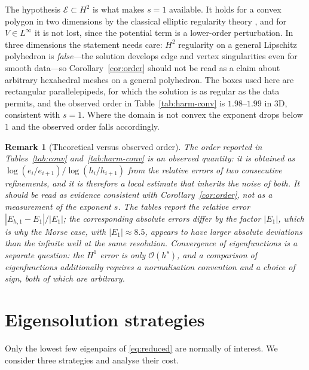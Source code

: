 \documentclass[pdflatex,sn-mathphys-num]{sn-jnl}
\theoremstyle{thmstyleone}%
\theoremstyle{thmstyletwo}%
\newtheorem{remark}{Remark}%
\theoremstyle{thmstylethree}%
\begin{document}
The hypothesis $\mathcal{E} \subset H^2$ is what makes $s = 1$ available. It
holds for a convex polygon in two dimensions by the classical elliptic
regularity theory \cite{boffi2010,babuska1991}, and for $V \in L^\infty$ it is not lost,
since the potential term is a lower-order perturbation. In three dimensions the
statement needs care: $H^2$ regularity on a general Lipschitz polyhedron is
\emph{false}---the solution develops edge and vertex singularities even for
smooth data---so Corollary~\ref{cor:order} should not be read as a claim about
arbitrary hexahedral meshes on a general polyhedron. The boxes used here are
rectangular parallelepipeds, for which the solution is as regular as the data
permits, and the observed order in Table~\ref{tab:harm-conv} is $1.98$--$1.99$
in 3D, consistent with $s = 1$. Where the domain is not convex the exponent
drops below $1$ and the observed order falls accordingly.

\begin{remark}[Theoretical versus observed order]\label{rem:order}
The order reported in Tables~\ref{tab:conv} and~\ref{tab:harm-conv} is an
\emph{observed} quantity: it is obtained as
$\log(e_{i}/e_{i+1})/\log(h_{i}/h_{i+1})$ from the relative errors of two
consecutive refinements, and it is therefore a local estimate that inherits the
noise of both. It should be read as evidence consistent with
Corollary~\ref{cor:order}, not as a measurement of the exponent $s$. The tables
report the relative error $|E_{h,1}-E_1|/|E_1|$; the corresponding absolute
errors differ by the factor $|E_1|$, which is why the Morse case, with
$|E_1| \approx 8.5$, appears to have larger absolute deviations than the
infinite well at the same resolution. Convergence of eigenfunctions is a
separate question: the $H^1$ error is only $\mathcal{O}(h^{s})$, and a comparison
of eigenfunctions additionally requires a normalisation convention and a choice
of sign, both of which are arbitrary.
\end{remark}

\section{Eigensolution strategies}\label{sec:strategies}

Only the lowest few eigenpairs of \eqref{eq:reduced} are normally of interest.
We consider three strategies and analyse their cost.
\end{document}
